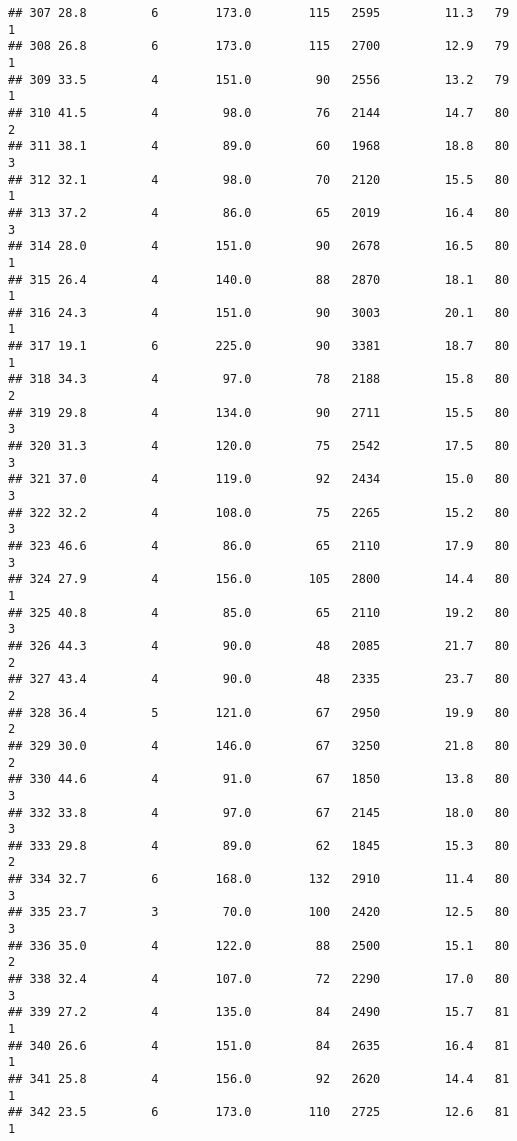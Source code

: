 \documentclass[
]{article}
\begin{document}
\begin{verbatim}
## 307 28.8         6        173.0        115   2595         11.3   79      1
## 308 26.8         6        173.0        115   2700         12.9   79      1
## 309 33.5         4        151.0         90   2556         13.2   79      1
## 310 41.5         4         98.0         76   2144         14.7   80      2
## 311 38.1         4         89.0         60   1968         18.8   80      3
## 312 32.1         4         98.0         70   2120         15.5   80      1
## 313 37.2         4         86.0         65   2019         16.4   80      3
## 314 28.0         4        151.0         90   2678         16.5   80      1
## 315 26.4         4        140.0         88   2870         18.1   80      1
## 316 24.3         4        151.0         90   3003         20.1   80      1
## 317 19.1         6        225.0         90   3381         18.7   80      1
## 318 34.3         4         97.0         78   2188         15.8   80      2
## 319 29.8         4        134.0         90   2711         15.5   80      3
## 320 31.3         4        120.0         75   2542         17.5   80      3
## 321 37.0         4        119.0         92   2434         15.0   80      3
## 322 32.2         4        108.0         75   2265         15.2   80      3
## 323 46.6         4         86.0         65   2110         17.9   80      3
## 324 27.9         4        156.0        105   2800         14.4   80      1
## 325 40.8         4         85.0         65   2110         19.2   80      3
## 326 44.3         4         90.0         48   2085         21.7   80      2
## 327 43.4         4         90.0         48   2335         23.7   80      2
## 328 36.4         5        121.0         67   2950         19.9   80      2
## 329 30.0         4        146.0         67   3250         21.8   80      2
## 330 44.6         4         91.0         67   1850         13.8   80      3
## 332 33.8         4         97.0         67   2145         18.0   80      3
## 333 29.8         4         89.0         62   1845         15.3   80      2
## 334 32.7         6        168.0        132   2910         11.4   80      3
## 335 23.7         3         70.0        100   2420         12.5   80      3
## 336 35.0         4        122.0         88   2500         15.1   80      2
## 338 32.4         4        107.0         72   2290         17.0   80      3
## 339 27.2         4        135.0         84   2490         15.7   81      1
## 340 26.6         4        151.0         84   2635         16.4   81      1
## 341 25.8         4        156.0         92   2620         14.4   81      1
## 342 23.5         6        173.0        110   2725         12.6   81      1

\end{verbatim}
\end{document}
